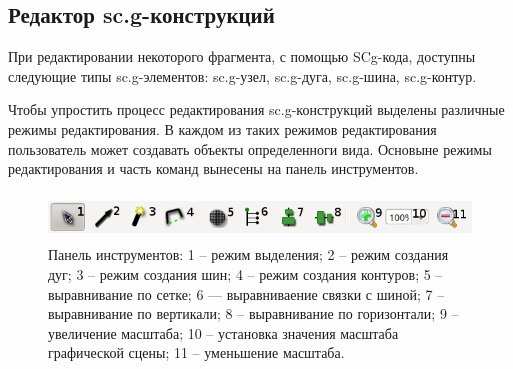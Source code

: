 \subsection{Редактор sc.g-конструкций}
При редактировании некоторого фрагмента, с помощью SCg-кода, доступны следующие типы sc.g-элементов: {\sf sc.g-узел}, {\sf sc.g-дуга}, {\sf sc.g-шина}, {\sf sc.g-контур}.
 
Чтобы упростить процесс редактирования sc.g-конструкций выделены различные режимы редактирования. В каждом из таких режимов редактирования пользователь может создавать объекты определенноги вида. Основыне режимы редактирования и часть команд вынесены на панель инструментов. 
\begin{figure}[h]
	\includegraphics[width=15.77cm, height=1.27cm]{../images/scgtoolbar.png}
	\caption{Панель инструментов: 1 – режим выделения; 2 – режим создания дуг; 3 – режим создания шин; 4 – режим создания контуров; 5 – выравнивание по сетке; 6 — выравниваение связки с шиной; 
7 – выравнивание по вертикали; 8 – выравнивание по горизонтали; 9 – увеличение масштаба; 10 – установка значения масштаба графической сцены; 11 – уменьшение масштаба.}
	\label{scgtoolbar}
\end{figure}

